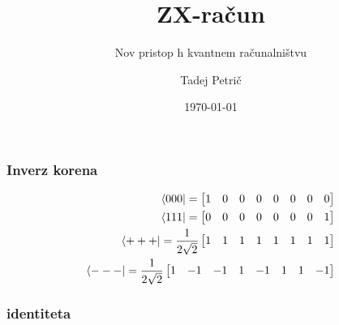 \documentclass[10pt]{beamer}
\title{ZX-račun}
\subtitle{Nov pristop h kvantnem računalništvu}
\date{\today}
\author{Tadej Petrič}
\institute{Fakulteta za matematiko in fiziko}
\begin{document}
\begin{frame}
  \maketitle
\end{frame}
\begin{frame}
  \frametitle{Inverz korena}
  \begin{align*}
    \bra{000} = \begin{bmatrix}
        1&0&0&0& 0&0&0&0
    \end{bmatrix}\\
    \bra{111} = \begin{bmatrix}
        0&0&0&0& 0&0&0&1
    \end{bmatrix}\\
    \bra{+++} = \frac{1}{2\sqrt{2}}\begin{bmatrix}
        1&1&1&1& 1&1&1&1
    \end{bmatrix}\\
    \bra{---} = \frac{1}{2\sqrt{2}} \begin{bmatrix}
        1&-1&-1&1& -1&1&1&-1
    \end{bmatrix}
\end{align*}
\end{frame}
\begin{frame}
  \frametitle{identiteta}
\end{frame}
\end{document}
